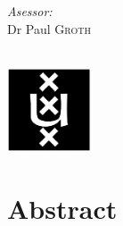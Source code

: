 \documentclass{article}
\newcommand{\red}[1]{{\color{red}{#1}}}
\begin{document}
\begin{titlepage}
\begin{minipage}[t]{0.4\textwidth}
\begin{flushright}
\emph{Asessor:} \\

Dr Paul \textsc{Groth}\\

\end{flushright}

\end{minipage}\\[2cm]









\includegraphics[width=2.5cm]{data/images/uva.png}\\ %


 




\vfill %



\end{titlepage}

\tableofcontents
\newpage
\listoffigures
\listoftables
\newpage

\section*{Abstract}
\end{document}
